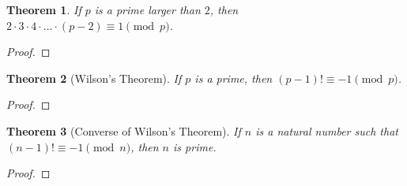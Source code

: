 \documentclass[12pt,leqno]{article}
\numberwithin{equation}{section}
\newtheorem{thm}{Theorem}[section]
\theoremstyle{definition}
\begin{document}
\begin{thm}
If $p$ is a prime larger than $2$, then $2 \cdot 3 \cdot 4 \cdot
\hdots \cdot (p-2) \equiv 1 \pmod{p}$.
\end{thm}
\begin{proof}[Proof]
\end{proof}


\begin{thm}[Wilson's Theorem]
If $p$ is a prime, then $(p - 1)! \equiv -1 \pmod{p}$.
\end{thm}
\begin{proof}[Proof]
\end{proof}

\begin{thm}[Converse of Wilson's Theorem]
If $n$ is a natural number such that $(n - 1)! \equiv -1 \pmod{n}$,
then $n$ is prime.
\end{thm}
\begin{proof}[Proof]
\end{proof}
\end{document}
